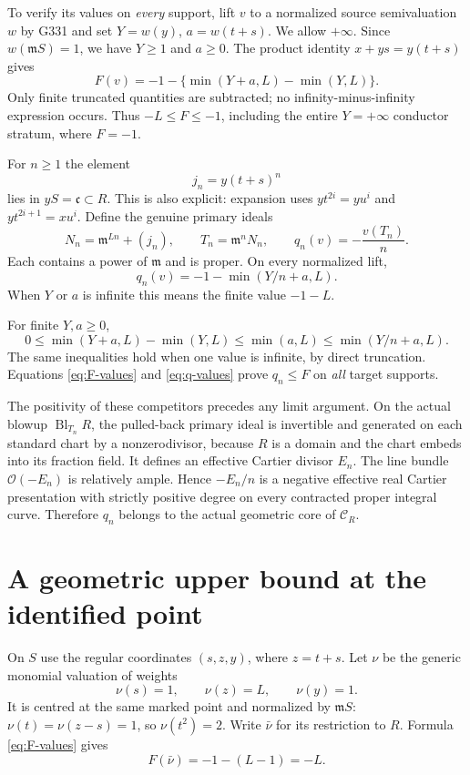 \documentclass[11pt]{article}
\newcommand{\m}{\mathfrak m}
\newcommand{\Cc}{\mathcal C}
\begin{document}
To verify its values on \emph{every} support, lift $v$ to a normalized
source semivaluation $w$ by G331 and set
$Y=w(y)$, $a=w(t+s)$. We allow $+\infty$. Since $w(\m S)=1$, we have
$Y\ge1$ and $a\ge0$. The product identity $x+ys=y(t+s)$ gives
\begin{equation}\label{eq:F-values}
 F(v)=-1-\{\min(Y+a,L)-\min(Y,L)\}.
\end{equation}
Only finite truncated quantities are subtracted; no infinity-minus-infinity
expression occurs. Thus $-L\le F\le-1$, including the entire
$Y=+\infty$ conductor stratum, where $F=-1$.

For $n\ge1$ the element
\[
 j_n=y(t+s)^n
\]
lies in $yS=\mathfrak c\subset R$. This is also explicit: expansion uses
$yt^{2i}=yu^i$ and $yt^{2i+1}=xu^i$. Define the genuine primary ideals
\[
 N_n=\m^{Ln}+(j_n),\qquad T_n=\m^nN_n,\qquad
 q_n(v)=-\frac{v(T_n)}n .
\]
Each contains a power of $\m$ and is proper. On every normalized lift,
\begin{equation}\label{eq:q-values}
 q_n(v)=-1-\min(Y/n+a,L).
\end{equation}
When $Y$ or $a$ is infinite this means the finite value $-1-L$.

For finite $Y,a\ge0$,
\[
 0\le\min(Y+a,L)-\min(Y,L)\le\min(a,L)
 \le\min(Y/n+a,L).
\]
The same inequalities hold when one value is infinite, by direct
truncation. Equations \eqref{eq:F-values} and \eqref{eq:q-values}
prove $q_n\le F$ on \emph{all} target supports.

The positivity of these competitors precedes any limit argument.
On the actual blowup $\operatorname{Bl}_{T_n}R$, the pulled-back
primary ideal is invertible and generated on each standard chart by a
nonzerodivisor, because $R$ is a domain and the chart embeds into its
fraction field. It defines an effective Cartier divisor $E_n$.
The line bundle $\mathcal O(-E_n)$ is relatively ample. Hence
$-E_n/n$ is a negative effective real Cartier presentation with
strictly positive degree on every contracted proper integral curve.
Therefore $q_n$ belongs to the actual geometric core of $\Cc_R$.

\section{A geometric upper bound at the identified point}
On $S$ use the regular coordinates $(s,z,y)$, where $z=t+s$.
Let $\nu$ be the generic monomial valuation of weights
\[
 \nu(s)=1,\qquad \nu(z)=L,\qquad \nu(y)=1 .
\]
It is centred at the same marked point and normalized by $\m S$:
$\nu(t)=\nu(z-s)=1$, so $\nu(t^2)=2$.
Write $\bar\nu$ for its restriction to $R$. Formula
\eqref{eq:F-values} gives
\begin{equation}\label{eq:nuF}
 F(\bar\nu)=-1-(L-1)=-L.
\end{equation}
\end{document}
